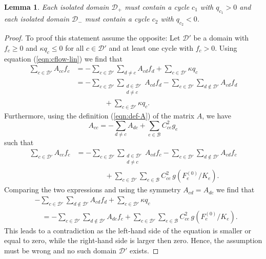 \documentclass[10pt,aps,pra,twocolumn,superscriptaddress]{revtex4-1}
\newcommand{\be}{\begin{equation}}
\newcommand{\ee}{\end{equation}}
\newcommand{\nn}{\nonumber}
\newcommand{\DD}{\mathcal{D}}
\newtheorem{lemma}{Lemma}
\begin{document}
\begin{lemma}
Each isolated domain $\DD_+$ must contain a cycle $c_1$ 
with $q_{c_1} > 0$ and each isolated domain $\DD_-$ must contain a
cycle $c_2$ with $q_{c_2} < 0$.
\end{lemma}

\begin{proof}
To proof this statement assume the opposite: Let $\DD'$ be a domain with $f_c \ge 0$ 
and $\kappa q_c \le 0$ for all $c \in \DD'$ and at least one cycle with $f_c > 0$.
Using equation (\ref{eqn:cflow-lin}) we find that 
\begin{align}
    \sum_{c \in \DD'} A_{cc} f_c &= - \sum_{c \in \DD'} \sum_{d \neq c} A_{cd} f_d
           +  \sum_{c \in \DD'} \kappa q_c   \nn \\
       & =  - \sum_{c \in \DD'} \sum_{\substack{d \in \DD' \\ d \neq c}} A_{cd} f_d 
              - \sum_{c \in \DD'} \sum_{d \notin \DD'} A_{cd} f_d \nn \\
      & \qquad \qquad + \sum_{c \in \DD'} \kappa q_c .       
\end{align}
Furthermore, using the definition (\ref{eqn:def-A}) of the matrix $A$, we have
\be
    A_{cc} = - \sum_{d \neq c} A_{dc}    + \sum_{e \in \mathcal{B}} C_{ce}^2 g_e       
\ee
such that
\begin{align}
    \sum_{c \in \DD'} A_{cc} f_c 
       & =  - \sum_{c \in \DD'} \sum_{ \substack{d \in \DD' \\ d \neq c}} A_{cd} f_c 
              - \sum_{c \in \DD'} \sum_{d \notin \DD'} A_{cd} f_c \nn \\
      & \qquad \qquad + \sum_{c \in \DD'} \sum_{e \in \mathcal{B}} C_{ce}^2  \, g(F^{(0)}_e/K_e).     
\end{align}
Comparing the two expressions and using the symmetry $A_{cd} = A_{dc}$
we find that
\begin{align}
  &  - \sum_{c \in \DD'} \sum_{d \notin \DD'} A_{cd} f_d 
                + \sum_{c \in \DD'} \kappa q_c \nn \\
   & \quad =   - \sum_{c \in \DD'} \sum_{d \notin \DD'} A_{dc} f_c 
             + \sum_{c \in \DD'} \sum_{e \in \mathcal{B}} C_{ce}^2 \, g(F^{(0)}_e/K_e).
\end{align}
This leads to a contradiction as the left-hand side of the equation is smaller or 
equal to zero, while the right-hand side is larger then zero. Hence, the assumption 
must be wrong and no such domain $\DD'$ exists. 
\end{proof}
\end{document}
